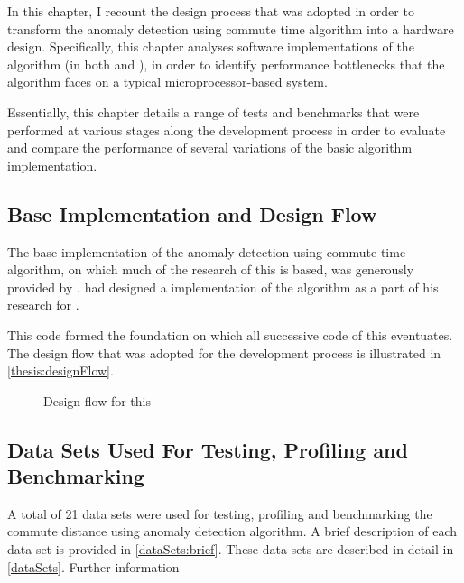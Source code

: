 In this chapter, I recount the design process that was adopted in order to
transform the anomaly detection using commute time algorithm into a hardware
design. Specifically, this chapter analyses software implementations of the
algorithm (in both  and ), in order to identify
performance bottlenecks that the algorithm faces on a typical
microprocessor-based system.

Essentially, this chapter details a range of tests and benchmarks that were
performed at various stages along the development process in order to evaluate
and compare the performance of several variations of the basic algorithm
implementation.

\subsection{Base Implementation and Design Flow}
\label{software:baseImplementation}
The base implementation of the anomaly detection using commute time algorithm,
on which much of the research of this \thesis{} is based, was generously
provided by \citeauthor{Khoa:2012}. \citeauthor{Khoa:2012} had designed a
 implementation of the algorithm as a part of his research for
 \cite{Khoa:2012}.

This  code formed the foundation on which all successive code
of this \thesis{} eventuates. The design flow that was adopted for the
development process is illustrated in \autoref{thesis:designFlow}.

\begin{figure}
    \centering
    
    \caption{Design flow for this \thesis{}}
    \label{thesis:designFlow}
\end{figure}

\subsection{Data Sets Used For Testing, Profiling and Benchmarking}
\label{software:datasets}
A total of 21 data sets were used for testing, profiling and benchmarking the
commute distance using anomaly detection algorithm. A brief description of each
data set is provided in \autoref{dataSets:brief}. These data sets are
described in detail in \autoref{dataSets}. Further information


